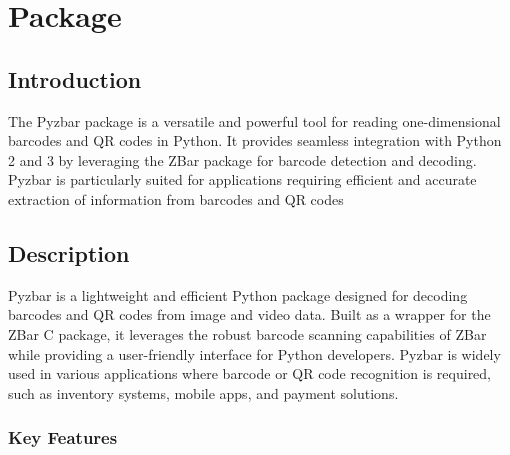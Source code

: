 %
%

\chapter{Package }

\section{Introduction}

The Pyzbar package is a versatile and powerful tool for reading one-dimensional barcodes and QR codes in Python. It provides seamless integration with Python 2 and 3 by leveraging the ZBar package for barcode detection and decoding. Pyzbar is particularly suited for applications requiring efficient and accurate extraction of information from barcodes and QR codes \cite{pyzbargithub:2024}

\section{Description}

Pyzbar is a lightweight and efficient Python package designed for decoding barcodes and QR codes from image and video data. Built as a wrapper for the ZBar C package, it leverages the robust barcode scanning capabilities of ZBar while providing a user-friendly interface for Python developers. Pyzbar is widely used in various applications where barcode or QR code recognition is required, such as inventory systems, mobile apps, and payment solutions.\cite{pyzbarpypi:2024}

\subsection{Key Features}

